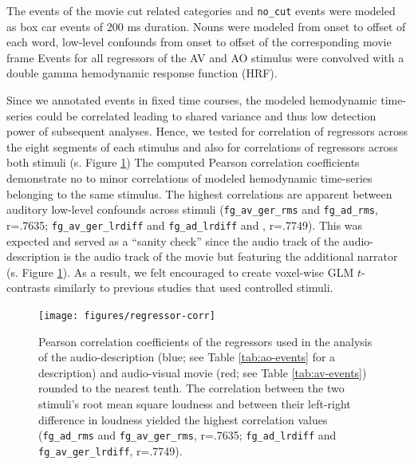 \documentclass[english]{article}
\begin{document}
The events of the movie cut related categories and \texttt{no\_cut} events were
modeled as box car events of 200 ms duration.
%
Nouns were modeled from onset to offset of each word, low-level confounds from
onset to offset of the corresponding movie frame
Events for all regressors of the AV and AO stimulus were convolved with a double
gamma hemodynamic response function (HRF).

Since we annotated events in fixed time courses, the modeled hemodynamic
time-series could be correlated leading to shared variance and thus low
detection power of subsequent analyses.
Hence, we tested for correlation of regressors across the eight segments of each
stimulus and also for correlations of regressors across both stimuli (s. Figure
\ref{fig:reg-corr})
The computed Pearson correlation coefficients demonstrate no to minor
correlations of modeled hemodynamic time-series belonging to the same stimulus.
The highest correlations are apparent between auditory low-level confounds
across stimuli (\texttt{fg\_av\_ger\_rms} and \texttt{fg\_ad\_rms}, r=.7635;
\texttt{fg\_av\_ger\_lrdiff} and \texttt{fg\_ad\_lrdiff} and , r=.7749).
This was expected and served as a ``sanity check'' since the audio track of the
audio-description is the audio track of the movie but featuring the additional
narrator (s. Figure \ref{fig:reg-corr}).
As a result, we felt encouraged to create voxel-wise GLM $t$-contrasts similarly
to previous studies that used controlled stimuli.


\begin{figure}[h!]
\centering
    \texttt{[image: figures/regressor-corr]} \caption{Pearson
        correlation coefficients of the regressors used in the analysis of the
        audio-description (blue; see Table \ref{tab:ao-events} for a
        description) and audio-visual movie (red; see Table \ref{tab:av-events})
        rounded to the nearest tenth.
        The correlation between the two stimuli's
        root mean square loudness and between their left-right difference in
        loudness yielded the highest correlation values
        (\texttt{fg\_ad\_rms} and \texttt{fg\_av\_ger\_rms}, r=.7635;
        \texttt{fg\_ad\_lrdiff} and \texttt{fg\_av\_ger\_lrdiff}, r=.7749).
      }
\label{fig:reg-corr}
\end{figure}
\end{document}
